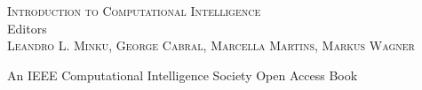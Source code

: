 

\thispagestyle{empty}
\providecommand\pdfbookmark[3][]{} \pdfbookmark[0]{Title Page}{bm:Title}
\vspace*{1cm}
\vfill
\begin{flushleft}
\textsc{\huge{Introduction to Computational Intelligence}}\\
\vfill
Editors\\[\baselineskip]
\textsc{\Large{Leandro L. Minku, George Cabral, Marcella Martins, Markus Wagner}}
\vfill
\end{flushleft}
\begin{flushright}
An IEEE Computational Intelligence Society Open Access Book\\[-0.8em]
\end{flushright}
\clearpage

